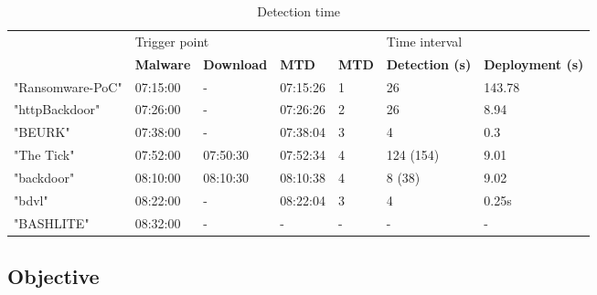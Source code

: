\begin{table}
    \centering
    \caption{Detection time}\label{table:evaluation-detection-time}
    \scriptsize
    \begin{tabular}{lllllll}
        \hline
        & \multicolumn{3}{l|}{Trigger point} & \multicolumn{1}{l|}{} & Time interval & \\
        & \textbf{Malware} & \textbf{Download} & \multicolumn{1}{l|}{\textbf{MTD}} & \multicolumn{1}{l|}{\textbf{MTD}} & \textbf{Detection (s)} & \textbf{Deployment (s)} \\
        \hline
        "Ransomware-PoC" & 07:15:00 & - & 07:15:26 & 1 & 26 & 143.78 \\
        "httpBackdoor" & 07:26:00 & - & 07:26:26 & 2 & 26 & 8.94 \\
        "BEURK" & 07:38:00 & - & 07:38:04 & 3 & 4 & 0.3 \\
        "The Tick" & 07:52:00 & 07:50:30 & 07:52:34 & 4 & 124 (154) & 9.01 \\
        "backdoor" & 08:10:00 & 08:10:30 & 08:10:38 & 4 & 8 (38) & 9.02 \\
        "bdvl" & 08:22:00 & - & 08:22:04 & 3 & 4 & 0.25s \\
        "BASHLITE" & 08:32:00 & - & - & - & - & - \\
        \hline
    \end{tabular}
\end{table}


\subsection{Objective}
